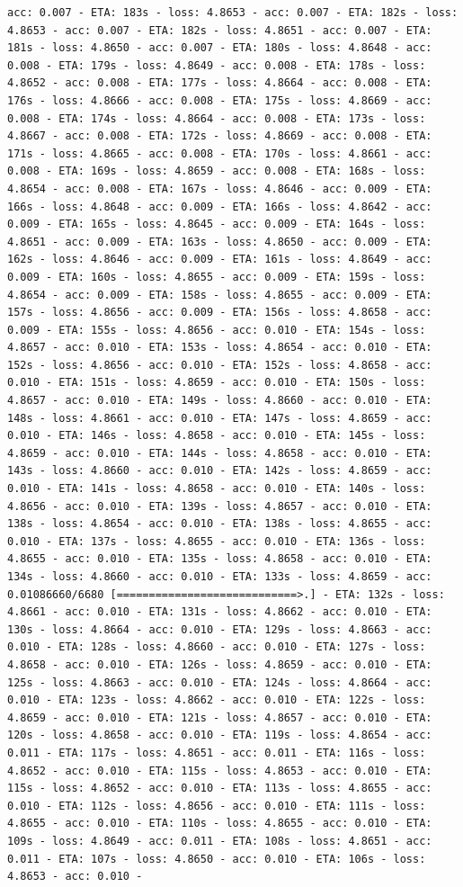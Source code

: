 \documentclass[11pt]{article}
\begin{document}
\begin{Verbatim}[commandchars=\\\{\}]
acc: 0.007 - ETA: 183s - loss: 4.8653 - acc: 0.007 - ETA: 182s - loss: 4.8653 - acc: 0.007 - ETA: 182s - loss: 4.8651 - acc: 0.007 - ETA: 181s - loss: 4.8650 - acc: 0.007 - ETA: 180s - loss: 4.8648 - acc: 0.008 - ETA: 179s - loss: 4.8649 - acc: 0.008 - ETA: 178s - loss: 4.8652 - acc: 0.008 - ETA: 177s - loss: 4.8664 - acc: 0.008 - ETA: 176s - loss: 4.8666 - acc: 0.008 - ETA: 175s - loss: 4.8669 - acc: 0.008 - ETA: 174s - loss: 4.8664 - acc: 0.008 - ETA: 173s - loss: 4.8667 - acc: 0.008 - ETA: 172s - loss: 4.8669 - acc: 0.008 - ETA: 171s - loss: 4.8665 - acc: 0.008 - ETA: 170s - loss: 4.8661 - acc: 0.008 - ETA: 169s - loss: 4.8659 - acc: 0.008 - ETA: 168s - loss: 4.8654 - acc: 0.008 - ETA: 167s - loss: 4.8646 - acc: 0.009 - ETA: 166s - loss: 4.8648 - acc: 0.009 - ETA: 166s - loss: 4.8642 - acc: 0.009 - ETA: 165s - loss: 4.8645 - acc: 0.009 - ETA: 164s - loss: 4.8651 - acc: 0.009 - ETA: 163s - loss: 4.8650 - acc: 0.009 - ETA: 162s - loss: 4.8646 - acc: 0.009 - ETA: 161s - loss: 4.8649 - acc: 0.009 - ETA: 160s - loss: 4.8655 - acc: 0.009 - ETA: 159s - loss: 4.8654 - acc: 0.009 - ETA: 158s - loss: 4.8655 - acc: 0.009 - ETA: 157s - loss: 4.8656 - acc: 0.009 - ETA: 156s - loss: 4.8658 - acc: 0.009 - ETA: 155s - loss: 4.8656 - acc: 0.010 - ETA: 154s - loss: 4.8657 - acc: 0.010 - ETA: 153s - loss: 4.8654 - acc: 0.010 - ETA: 152s - loss: 4.8656 - acc: 0.010 - ETA: 152s - loss: 4.8658 - acc: 0.010 - ETA: 151s - loss: 4.8659 - acc: 0.010 - ETA: 150s - loss: 4.8657 - acc: 0.010 - ETA: 149s - loss: 4.8660 - acc: 0.010 - ETA: 148s - loss: 4.8661 - acc: 0.010 - ETA: 147s - loss: 4.8659 - acc: 0.010 - ETA: 146s - loss: 4.8658 - acc: 0.010 - ETA: 145s - loss: 4.8659 - acc: 0.010 - ETA: 144s - loss: 4.8658 - acc: 0.010 - ETA: 143s - loss: 4.8660 - acc: 0.010 - ETA: 142s - loss: 4.8659 - acc: 0.010 - ETA: 141s - loss: 4.8658 - acc: 0.010 - ETA: 140s - loss: 4.8656 - acc: 0.010 - ETA: 139s - loss: 4.8657 - acc: 0.010 - ETA: 138s - loss: 4.8654 - acc: 0.010 - ETA: 138s - loss: 4.8655 - acc: 0.010 - ETA: 137s - loss: 4.8655 - acc: 0.010 - ETA: 136s - loss: 4.8655 - acc: 0.010 - ETA: 135s - loss: 4.8658 - acc: 0.010 - ETA: 134s - loss: 4.8660 - acc: 0.010 - ETA: 133s - loss: 4.8659 - acc: 0.01086660/6680 [============================>.] - ETA: 132s - loss: 4.8661 - acc: 0.010 - ETA: 131s - loss: 4.8662 - acc: 0.010 - ETA: 130s - loss: 4.8664 - acc: 0.010 - ETA: 129s - loss: 4.8663 - acc: 0.010 - ETA: 128s - loss: 4.8660 - acc: 0.010 - ETA: 127s - loss: 4.8658 - acc: 0.010 - ETA: 126s - loss: 4.8659 - acc: 0.010 - ETA: 125s - loss: 4.8663 - acc: 0.010 - ETA: 124s - loss: 4.8664 - acc: 0.010 - ETA: 123s - loss: 4.8662 - acc: 0.010 - ETA: 122s - loss: 4.8659 - acc: 0.010 - ETA: 121s - loss: 4.8657 - acc: 0.010 - ETA: 120s - loss: 4.8658 - acc: 0.010 - ETA: 119s - loss: 4.8654 - acc: 0.011 - ETA: 117s - loss: 4.8651 - acc: 0.011 - ETA: 116s - loss: 4.8652 - acc: 0.010 - ETA: 115s - loss: 4.8653 - acc: 0.010 - ETA: 115s - loss: 4.8652 - acc: 0.010 - ETA: 113s - loss: 4.8655 - acc: 0.010 - ETA: 112s - loss: 4.8656 - acc: 0.010 - ETA: 111s - loss: 4.8655 - acc: 0.010 - ETA: 110s - loss: 4.8655 - acc: 0.010 - ETA: 109s - loss: 4.8649 - acc: 0.011 - ETA: 108s - loss: 4.8651 - acc: 0.011 - ETA: 107s - loss: 4.8650 - acc: 0.010 - ETA: 106s - loss: 4.8653 - acc: 0.010 - 
\end{Verbatim}
\end{document}
